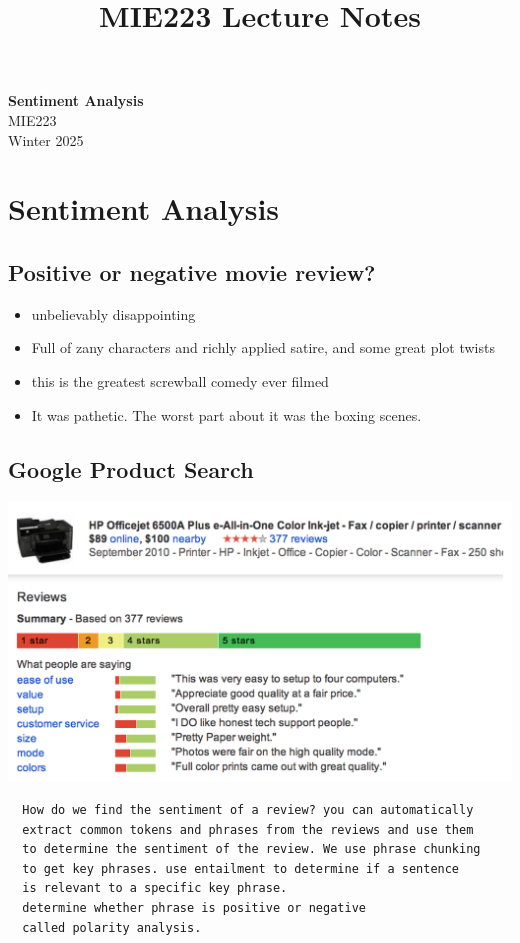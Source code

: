 \documentclass[11pt]{article}
\theoremstyle{definition}
\begin{document}
\setcounter{section}{0}
\title{MIE223 Lecture Notes}

\thispagestyle{empty}

\begin{center}
{\LARGE \bf Sentiment Analysis}\\
{\large MIE223}\\
Winter 2025
\end{center}
\section{Sentiment Analysis}
\subsection{Positive or negative movie review?}
\begin{itemize}
  \item unbelievably disappointing
  \item Full of zany characters and richly applied satire, and some
  great plot twists
  \item this is the greatest screwball comedy ever filmed
  \item It was pathetic. The worst part about it was the boxing
  scenes.
\end{itemize}

\subsection{Google Product Search}
\includegraphics[width=\textwidth/2]{5.png}
\begin{verbatim}
  How do we find the sentiment of a review? you can automatically 
  extract common tokens and phrases from the reviews and use them 
  to determine the sentiment of the review. We use phrase chunking 
  to get key phrases. use entailment to determine if a sentence 
  is relevant to a specific key phrase.
  determine whether phrase is positive or negative
  called polarity analysis.
\end{verbatim}
\end{document}
